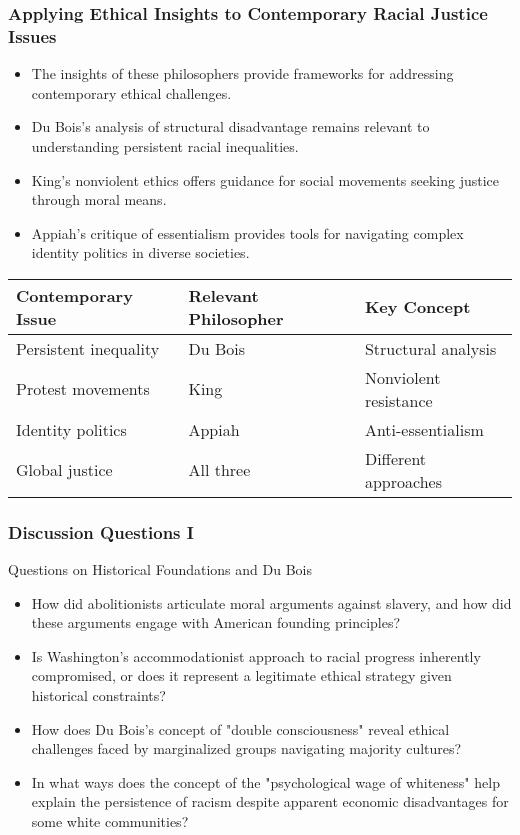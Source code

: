 \documentclass{beamer}
\begin{document}
	\begin{frame}
		\frametitle{Applying Ethical Insights to Contemporary Racial Justice Issues}
		
		\begin{itemize}
			\item The insights of these philosophers provide frameworks for addressing contemporary ethical challenges.
			\item Du Bois's analysis of structural disadvantage remains relevant to understanding persistent racial inequalities.
			\item King's nonviolent ethics offers guidance for social movements seeking justice through moral means.
			\item Appiah's critique of essentialism provides tools for navigating complex identity politics in diverse societies.
		\end{itemize}
		
		\begin{table}
			\begin{tabular}{lll}
				\toprule
				\textbf{Contemporary Issue} & \textbf{Relevant Philosopher} & \textbf{Key Concept} \\
				\midrule
				Persistent inequality & Du Bois & Structural analysis \\
				Protest movements & King & Nonviolent resistance \\
				Identity politics & Appiah & Anti-essentialism \\
				Global justice & All three & Different approaches \\
				\bottomrule
			\end{tabular}
		\end{table}
		
	\end{frame}
	
	\begin{frame}
		\frametitle{Discussion Questions I}
		
		\begin{exampleblock}{Questions on Historical Foundations and Du Bois}
			\begin{itemize}
				\item How did abolitionists articulate moral arguments against slavery, and how did these arguments engage with American founding principles?
				\item Is Washington's accommodationist approach to racial progress inherently compromised, or does it represent a legitimate ethical strategy given historical constraints?
				\item How does Du Bois's concept of "double consciousness" reveal ethical challenges faced by marginalized groups navigating majority cultures?
				\item In what ways does the concept of the "psychological wage of whiteness" help explain the persistence of racism despite apparent economic disadvantages for some white communities?
			\end{itemize}
		\end{exampleblock}
		
	\end{frame}
	
\end{document}
